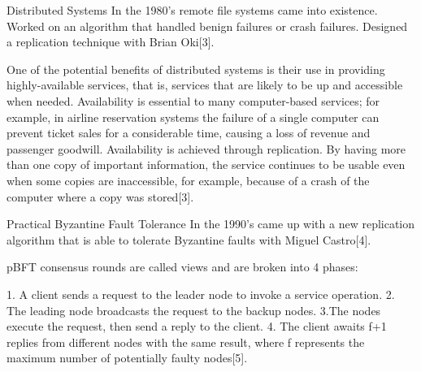 \documentclass{beamer}
\begin{document}
\begin{frame}{Distributed Systems}
In the 1980’s remote file systems came into existence. Worked on an algorithm that handled benign failures or crash failures.
 Designed a replication technique with Brian Oki[3].
 
 \vspace{2mm}
 
 One of the potential benefits of distributed systems is their use in providing highly-available services, that is, services that are likely to be up and accessible when needed. Availability is essential to many computer-based services; for example, in airline reservation systems the failure of a single computer can prevent ticket sales for a considerable time, causing a loss of revenue and passenger goodwill. Availability is achieved through replication. By having more than one copy of important information, the service continues to be usable even when some copies are inaccessible, for example, because of a crash of the computer where a copy was stored[3].


    
\end{frame}
\begin{frame}{Practical Byzantine Fault Tolerance}
In the 1990's came up with a new replication algorithm that  is able to tolerate Byzantine faults with Miguel Castro[4].

\vspace{2mm}

pBFT consensus rounds are called views and are broken into 4 phases:

   1. A client sends a request to the leader node to invoke a service operation.
   2. The leading node broadcasts the request to the backup nodes.
    3.The nodes execute the request, then send a reply to the client.
   4. The client awaits f+1 replies from different nodes with the same result, where f represents the maximum number of potentially faulty nodes[5].

\end{frame}
\end{document}
